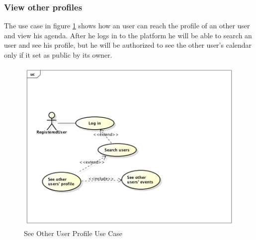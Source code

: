 \subsubsection{View other profiles}
The use case in figure \ref{fig:otherprofileusecase} shows how an user can reach the profile of an other user and view his agenda. After he logs in to the platform he will be able to search an user and see his profile, but he will be authorized to see the other user's calendar only if it set as public by its owner.   
 \begin{center}
 \begin{figure}[H]
    \includegraphics[width=1\textwidth]{../UMLDiagram/use_case/ViewOtherProfiles/UseCaseDiagram0.png}
    \caption{See Other User Profile Use Case}
     \label{fig:otherprofileusecase}
     \end{figure}
   \end{center}  
